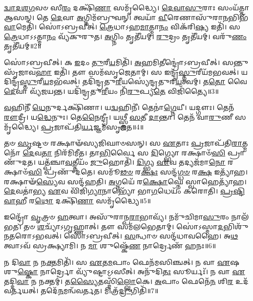 \-\ul{𑌦𑍍𑌵𑌾}\-\-\ul{𑌦}\-\-\ul{𑌶}\-\-\ul{𑌗}\-𑌵𑍞 𑌸𑍀\-\ul{𑌰𑌂} 𑌦𑌕𑍍𑌷𑌿᳴\-\ul{𑌣𑌾} 𑌸𑌮𑍃᳴𑌦𑍍𑌧𑍍𑌯𑍈।
\-\ul{𑌦𑍇}\-\-\ul{𑌵𑌾}\-\-\ul{𑌸𑍁}\-𑌰𑌾𑌃 𑌸𑌂𑌯᳴𑌤𑍍𑌤𑌾 𑌆𑌸𑌨𑍍।
𑌤𑍇 \ul{𑌦𑍇}\-𑌵𑌾 \ul{𑌅}\-𑌗𑍍𑌨𑌿𑌮᳴𑌬𑍍𑌰𑍁𑌵𑌨𑍍।
𑌤𑍍𑌵𑌯𑌾᳴ \ul{𑌵𑍀}\-𑌰𑍇𑌣𑌾𑌸𑍁᳴𑌰𑌾\-\ul{𑌨}\-𑌭𑌿𑌭᳴\-\ul{𑌵𑌾}\-𑌮𑍇𑌤𑌿᳴।
𑌸𑍋॑𑌽𑌬𑍍𑌰𑌵𑍀𑌤𑍍।
\-\ul{𑌤𑍍𑌰𑍇}\-𑌧𑌾\-𑌽𑌹\-\ul{𑌮𑌾}\-𑌤𑍍𑌮𑌾\-\ul{𑌨𑌂} 𑌵𑌿𑌕᳴𑌰𑌿\-\ul{𑌷𑍍𑌯} 𑌇𑌤𑌿᳴।
𑌸 \ul{𑌤𑍍𑌰𑍇}\-𑌧𑌾\-𑌽𑌽𑌤𑍍𑌮𑌾\-\ul{𑌨𑌂} 𑌵𑍍𑌯᳴𑌕𑍁𑌰𑍁𑌤।
\-\ul{𑌅}\-𑌗𑍍𑌨𑌿𑌂 𑌤𑍃𑌤𑍀᳴𑌯𑌮𑍍।
\-\ul{𑌰𑍁}\-𑌦𑍍𑌰𑌂 𑌤𑍃𑌤𑍀᳴𑌯𑌮𑍍।
𑌵𑌰𑍁᳴\-\ul{𑌣𑌂} 𑌤𑍃𑌤𑍀᳴𑌯𑌮𑍍॥2॥

𑌸𑍋॑𑌽𑌬𑍍𑌰𑌵𑍀𑌤𑍍।
𑌕 \ul{𑌇}\-𑌦𑌂 \ul{𑌤𑍁}\-𑌰𑍀\-\ul{𑌯}\-𑌮𑌿𑌤𑌿᳴।
\-\ul{𑌅}\-𑌹𑌮𑌿𑌤𑍀𑌨𑍍𑌦𑍍𑌰𑍋॑\-𑌽𑌬𑍍𑌰𑌵𑍀𑌤𑍍।
𑌸𑌨𑍍𑌤𑍁 𑌸𑍃᳴𑌜𑌾𑌵\-\ul{𑌹𑌾} 𑌇𑌤𑌿᳴।
𑌤𑍗 𑌸𑌮᳴𑌸𑍃𑌜𑍇𑌤𑌾𑌮𑍍।
𑌸 𑌇𑌨𑍍𑌦𑍍𑌰᳴\-\ul{𑌸𑍍𑌤𑍁}\-𑌰𑍀𑌯᳴𑌮𑌭𑌵𑌤𑍍।
𑌯𑌦𑌿𑌨𑍍𑌦𑍍𑌰᳴\-\ul{𑌸𑍍𑌤𑍁}\-𑌰𑍀\-\ul{𑌯}\-𑌮𑌭᳴𑌵𑌤𑍍।
𑌤𑌦𑌿᳴𑌨𑍍𑌦𑍍𑌰\-𑌤𑍁\-\ul{𑌰𑍀}\-𑌯𑌸𑍍𑌯𑍇॑𑌨𑍍𑌦𑍍𑌰\-𑌤𑍁𑌰𑍀\-\ul{𑌯}\-𑌤𑍍𑌵𑌮𑍍।
𑌤\-\ul{𑌤𑍋} 𑌵𑍈 \ul{𑌦𑍇}\-𑌵𑌾 𑌵𑍍𑌯᳴𑌜𑌯𑌨𑍍𑌤।
𑌯𑌦𑌿᳴𑌨𑍍𑌦𑍍𑌰𑌤𑍁\-\ul{𑌰𑍀}\-𑌯𑌂 𑌨𑌿᳴\-\ul{𑌰𑍁}\-𑌪𑍍𑌯\-\ul{𑌤𑍇} 𑌵𑌿𑌜𑌿᳴𑌤𑍍𑌯𑍈॥3॥

\-\ul{𑌵}\-𑌹𑌿𑌨𑍀᳴ \ul{𑌧𑍇}\-𑌨𑍁𑌰𑍍𑌦𑌕𑍍𑌷𑌿᳴𑌣𑌾।
𑌯\-\ul{𑌦𑍍𑌵}\-𑌹𑌿𑌨𑍀॑।
𑌤𑍇𑌨𑌾॑\-\ul{𑌗𑍍𑌨𑍇}\-𑌯𑍀।
𑌯𑌦𑍍𑌗𑍗𑌃।
𑌤𑍇𑌨᳴ \ul{𑌰𑍗}\-𑌦𑍍𑌰𑍀।
𑌯\-\ul{𑌦𑍍𑌧𑍇}\-𑌨𑍁𑌃।
𑌤𑍇\-\ul{𑌨𑍈}\-𑌨𑍍𑌦𑍍𑌰𑍀।
𑌯𑌥𑍍𑌸𑍍𑌤𑍍𑌰𑍀 \ul{𑌸}\-𑌤𑍀 \ul{𑌦𑌾}\-𑌨𑍍𑌤𑌾।
𑌤𑍇𑌨᳴ 𑌵𑌾\-\ul{𑌰𑍁}\-𑌣𑍀 𑌸𑌮𑍃᳴𑌦𑍍𑌧𑍍𑌯𑍈।
\-\ul{𑌪𑍍𑌰}\-𑌜𑌾𑌪᳴𑌤𑌿\-\ul{𑌰𑍍𑌯}\-𑌜𑍍𑌞𑌮᳴\-𑌸𑍃𑌜𑌤॥4॥

𑌤𑍞 \ul{𑌸𑍃}\-𑌷𑍍𑌟𑍞 𑌰𑌕𑍍𑌷𑌾𑍟᳴𑌸𑍍𑌯𑌜𑌿𑌘𑌾𑍞𑌸𑌨𑍍।
𑌸 \ul{𑌏}\-𑌤𑌾𑌃 \ul{𑌪𑍍𑌰}\-𑌜𑌾𑌪᳴𑌤𑌿\-\ul{𑌰𑌾}\-𑌤𑍍𑌮𑌨𑍋᳴ \ul{𑌦𑍇}\-𑌵\-\ul{𑌤𑌾} 𑌨𑌿𑌰᳴𑌮𑌿𑌮𑍀𑌤।
𑌤𑌾\-\ul{𑌭𑌿}\-𑌰𑍍𑌵𑍈 𑌸 \ul{𑌦𑌿}\-𑌗𑍍𑌭𑍍𑌯𑍋 𑌰𑌕𑍍𑌷𑌾𑍞᳴\-\ul{𑌸𑌿} 𑌪𑍍𑌰𑌾𑌣𑍁᳴𑌦𑌤।
𑌯𑌤𑍍𑌪᳴𑌞𑍍𑌚𑌾\-\ul{𑌵}\-𑌤𑍍𑌤𑍀𑌯𑌂᳴ \ul{𑌜𑍁}\-𑌹𑍋𑌤𑌿᳴।
\-\ul{𑌦𑌿}\-𑌗𑍍𑌭𑍍𑌯 \ul{𑌏}\-𑌵 𑌤𑌦𑍍𑌯𑌜᳴𑌮𑌾\-\ul{𑌨𑍋} 𑌰𑌕𑍍𑌷𑌾𑍞᳴\-\ul{𑌸𑌿} 𑌪𑍍𑌰𑌣𑍁᳴𑌦𑌤𑍇।
𑌸𑌮𑍂᳴\-\ul{𑌢}\-\-\ul{𑍞} 𑌰\-\ul{𑌕𑍍𑌷𑌃} 𑌸𑌨𑍍𑌦᳴\-\ul{𑌗𑍍𑌧}\-\-\ul{𑍞} 𑌰\-\ul{𑌕𑍍𑌷} 𑌇𑌤𑍍𑌯𑌾᳴𑌹।
𑌰𑌕𑍍𑌷𑌾𑍟᳴\-\ul{𑌸𑍍𑌯𑍇}\-𑌵 𑌸𑌨𑍍𑌦᳴𑌹𑌤𑌿।
\-\ul{𑌅}\-𑌗𑍍𑌨𑌯𑍇᳴ 𑌰\-\ul{𑌕𑍍𑌷𑍋}\-𑌘𑍍𑌨𑍇 𑌸𑍍𑌵𑌾𑌹𑍇𑌤𑍍𑌯𑌾᳴𑌹।
\-\ul{𑌦𑍇}\-𑌵𑌤𑌾॑𑌭𑍍𑌯 \ul{𑌏}\-𑌵 𑌵𑌿᳴𑌜𑌿\-\ul{𑌗𑍍𑌯𑌾}\-𑌨𑌾𑌭𑍍𑌯𑍋᳴ 𑌭𑌾\-\ul{𑌗}\-𑌧𑍇𑌯𑌂᳴ 𑌕𑌰𑍋𑌤𑌿।
\-\ul{𑌪𑍍𑌰}\-\-\ul{𑌷𑍍𑌟𑌿}\-\-\ul{𑌵𑌾}\-𑌹𑍀 𑌰\-\ul{𑌥𑍋} 𑌦𑌕𑍍𑌷𑌿᳴\-\ul{𑌣𑌾} 𑌸𑌮𑍃᳴𑌦𑍍𑌧𑍍𑌯𑍈॥5॥

𑌇𑌨𑍍𑌦𑍍𑌰𑍋᳴ \ul{𑌵𑍃}\-𑌤𑍍𑌰𑍞 \ul{𑌹}\-𑌤𑍍𑌵𑌾।
𑌅𑌸𑍁᳴𑌰𑌾𑌨𑍍𑌪\-\ul{𑌰𑌾}\-𑌭𑌾𑌵𑍍𑌯᳴।
𑌨𑌮𑍁᳴𑌚𑌿𑌮𑌾\-\ul{𑌸𑍁}\-𑌰𑌂 𑌨𑌾𑌲᳴𑌭𑌤।
𑌤𑍞 \ul{𑌶}\-𑌚𑍍𑌯𑌾᳴\-𑌽𑌗𑍃𑌹𑍍𑌣𑌾𑌤𑍍।
𑌤𑍗 𑌸𑌮᳴𑌲𑌭𑍇𑌤𑌾𑌮𑍍।
𑌸𑍋॑𑌽𑌸𑍍𑌮𑌾\-\ul{𑌦}\-𑌭𑌿𑌶𑍁᳴𑌨𑌤𑌰𑍋\-𑌽𑌭𑌵𑌤𑍍।
𑌸𑍋॑𑌽𑌬𑍍𑌰𑌵𑍀𑌤𑍍।
\-\ul{𑌸}\-𑌨𑍍𑌧𑌾𑍞 𑌸𑌨𑍍𑌦᳴𑌧𑌾𑌵𑌹𑍈।
𑌅\-\ul{𑌥} 𑌤𑍍𑌵𑌾𑌽𑌵᳴ 𑌸𑍍𑌰𑌕𑍍𑌷𑍍𑌯𑌾𑌮𑌿।
𑌨 \ul{𑌮𑌾} 𑌶𑍁𑌷𑍍𑌕𑍇᳴\-\ul{𑌣} 𑌨𑌾𑌰𑍍𑌦𑍍𑌰𑍇𑌣᳴ 𑌹𑌨𑌃॥6॥

𑌨 𑌦𑌿\-\ul{𑌵𑌾} 𑌨 𑌨\-\ul{𑌕𑍍𑌤}\-𑌮𑌿𑌤𑌿᳴।
𑌸 \ul{𑌏}\-𑌤\-\ul{𑌮}\-𑌪𑌾𑌂 𑌫𑍇𑌨᳴𑌮𑌸𑌿𑌞𑍍𑌚𑌤𑍍।
𑌨 𑌵𑌾 \ul{𑌏}\-𑌷 𑌶𑍁\-\ul{𑌷𑍍𑌕𑍋} 𑌨𑌾𑌰𑍍𑌦𑍍𑌰𑍋 𑌵𑍍𑌯𑍁᳴𑌷𑍍𑌟𑌾\-𑌽𑌽𑌸𑍀𑌤𑍍।
𑌅𑌨𑍁᳴𑌦𑌿\-\ul{𑌤𑌃} 𑌸𑍂𑌰𑍍𑌯𑌃᳴।
𑌨 𑌵𑌾 \ul{𑌏}\-𑌤𑌦𑍍𑌦𑌿\-\ul{𑌵𑌾} 𑌨 𑌨𑌕𑍍𑌤𑌮𑍍॑।
𑌤\-\ul{𑌸𑍍𑌯𑍈}\-𑌤𑌸𑍍𑌮𑌿𑌁᳴\-\ul{𑌲𑍍𑌲𑍋}\-𑌕𑍇।
\-\ul{𑌅}\-𑌪𑌾𑌂 𑌫𑍇𑌨𑍇᳴\-\ul{𑌨} 𑌶𑌿\-\ul{𑌰} 𑌉𑌦᳴𑌵𑌰𑍍𑌤𑌯𑌤𑍍।
𑌤𑌦𑍇᳴\-\ul{𑌨}\-𑌮𑌨𑍍𑌵᳴𑌵𑌰𑍍𑌤𑌤।
𑌮𑌿𑌤𑍍𑌰᳴\-\ul{𑌦𑍍𑌰𑍁}\-𑌗𑌿𑌤𑌿᳴॥7॥

